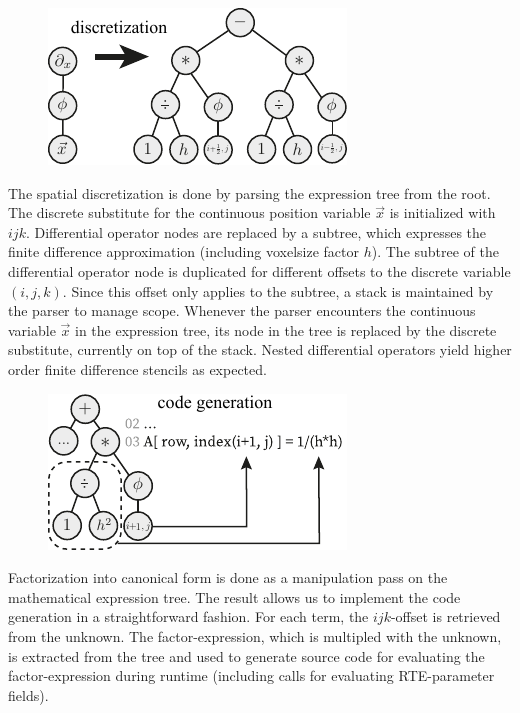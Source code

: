 \begin{figure}
\hspace{-.2in}
\includegraphics[width=0.6\columnwidth]{figures/fig_discretization_small.pdf}
\end{figure}The spatial discretization is done by parsing the expression tree from the root. The discrete substitute for the continuous position variable $\vec{x}$ is initialized with $ijk$. Differential operator nodes are replaced by a subtree, which expresses the finite difference approximation (including voxelsize factor $h$). The subtree of the differential operator node is duplicated for different offsets to the discrete variable $(i, j, k)$. Since this offset only applies to the subtree, a stack is maintained by the parser to manage scope. Whenever the parser encounters the continuous variable $\vec{x}$ in the expression tree, its node in the tree is replaced by the discrete substitute, currently on top of the stack. Nested differential operators yield higher order finite difference stencils as expected.

\begin{figure}
\hspace{-.2in}
\includegraphics[width=0.6\columnwidth]{figures/fig_codegen_small.pdf}
\end{figure}
Factorization into canonical form is done as a manipulation pass on the mathematical expression tree. The result allows us to implement the code generation in a straightforward fashion. For each term, the $ijk$-offset is retrieved from the unknown. The factor-expression, which is multipled with the unknown, is extracted from the tree and used to generate source code for evaluating the factor-expression during runtime (including calls for evaluating RTE-parameter fields).

